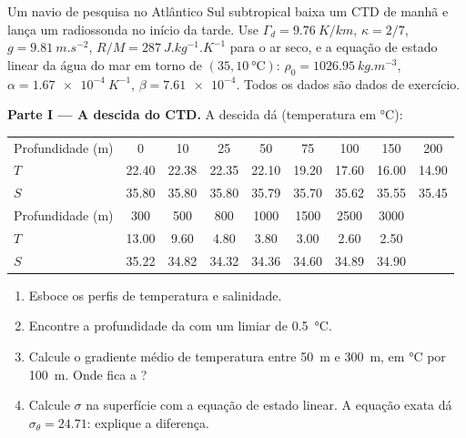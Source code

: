 \begin{problem}
\label{pb:b1:fluid-envelopes-structure:1}
Um navio de pesquisa no Atlântico Sul subtropical baixa um CTD de manhã e lança um radiossonda no
início da tarde. Use $\Gamma_d =
\qty{9.76}{K/km}$, $\kappa = 2/7$, $g = \qty{9.81}{m.s^{-2}}$, $R/M =
\qty{287}{J.kg^{-1}.K^{-1}}$ para o ar seco, e a equação de estado linear da água do mar em torno de
$(35, \qty{10}{\celsius})$: $\rho_0 = \qty{1026.95}{kg.m^{-3}}$,
$\alpha = \qty{1.67e-4}{K^{-1}}$, $\beta = \num{7.61e-4}$. Todos os dados são dados de exercício.

\medskip
\noindent\textbf{Parte I --- A descida do CTD.} A descida dá (temperatura em
\si{\celsius}):
\begin{center}
\small
\setlength{\tabcolsep}{3pt}
\begin{tabular}{|l|*{8}{c}|}
\hline
Profundidade (m) & 0 & 10 & 25 & 50 & 75 & 100 & 150 & 200 \\
$T$ & 22.40 & 22.38 & 22.35 & 22.10 & 19.20 & 17.60 & 16.00 & 14.90 \\
$S$ & 35.80 & 35.80 & 35.80 & 35.79 & 35.70 & 35.62 & 35.55 & 35.45 \\
\hline
Profundidade (m) & 300 & 500 & 800 & 1000 & 1500 & 2500 & 3000 & \\
$T$ & 13.00 & 9.60 & 4.80 & 3.80 & 3.00 & 2.60 & 2.50 & \\
$S$ & 35.22 & 34.82 & 34.32 & 34.36 & 34.60 & 34.89 & 34.90 & \\
\hline
\end{tabular}
\end{center}
\begin{enumerate}
  \item Esboce os perfis de temperatura e salinidade.
  \item Encontre a profundidade da  com um limiar de \qty{0.5}{\celsius}.
  \item Calcule o gradiente médio de temperatura entre \qty{50}{m} e \qty{300}{m}, em
        \si{\celsius} por \qty{100}{m}. Onde fica a ?
  \item Calcule $\sigma$ na superfície com a equação de estado linear. A equação exata dá
        $\sigma_\theta = 24.71$: explique a diferença.

\end{enumerate}
\end{problem}
